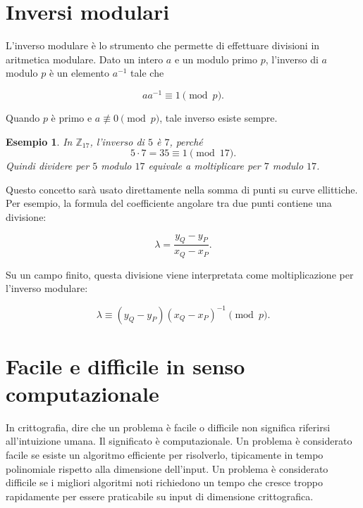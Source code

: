 \documentclass[12pt,a4paper,oneside]{report}
\newtheorem{example}{Esempio}[chapter]
\begin{document}
\section{Inversi modulari}

L'inverso modulare è lo strumento che permette di effettuare divisioni in aritmetica modulare. Dato un intero \(a\) e un modulo primo \(p\), l'inverso di \(a\) modulo \(p\) è un elemento \(a^{-1}\) tale che

\begin{equation}
    aa^{-1} \equiv 1 \pmod p.
\end{equation}

Quando \(p\) è primo e \(a \not\equiv 0 \pmod p\), tale inverso esiste sempre.

\begin{example}
In \(\mathbb{Z}_{17}\), l'inverso di \(5\) è \(7\), perché
\[
5 \cdot 7 = 35 \equiv 1 \pmod{17}.
\]
Quindi dividere per \(5\) modulo \(17\) equivale a moltiplicare per \(7\) modulo \(17\).
\end{example}

Questo concetto sarà usato direttamente nella somma di punti su curve ellittiche. Per esempio, la formula del coefficiente angolare tra due punti contiene una divisione:

\begin{equation}
    \lambda = \frac{y_Q-y_P}{x_Q-x_P}.
\end{equation}

Su un campo finito, questa divisione viene interpretata come moltiplicazione per l'inverso modulare:

\begin{equation}
    \lambda \equiv (y_Q-y_P)(x_Q-x_P)^{-1} \pmod p.
\end{equation}

\section{Facile e difficile in senso computazionale}

In crittografia, dire che un problema è facile o difficile non significa riferirsi all'intuizione umana. Il significato è computazionale. Un problema è considerato facile se esiste un algoritmo efficiente per risolverlo, tipicamente in tempo polinomiale rispetto alla dimensione dell'input. Un problema è considerato difficile se i migliori algoritmi noti richiedono un tempo che cresce troppo rapidamente per essere praticabile su input di dimensione crittografica.
\end{document}
